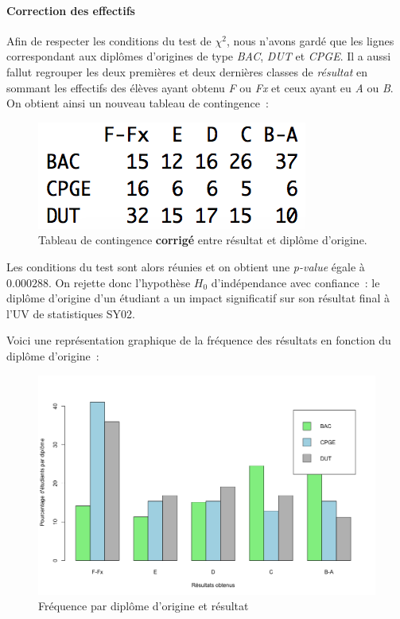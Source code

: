 \documentclass[a4paper,10pt]{report}
\begin{document}
\paragraph{Correction des effectifs}
Afin de respecter les conditions du test de $\chi^2$, nous n'avons gardé que les lignes correspondant aux diplômes d'origines de type \textit{BAC}, \textit{DUT} et \textit{CPGE}. Il a aussi fallut regrouper les deux premières et deux dernières classes de \textit{résultat} en sommant les effectifs des élèves ayant obtenu \textit{F} ou \textit{Fx} et ceux ayant eu \textit{A} ou \textit{B}.\\
On obtient ainsi un nouveau tableau de contingence~:


\begin{figure}[H]
	\centering
	\captionsetup{justification=centering, margin=4cm}
	\includegraphics[width=0.3\linewidth]{img/1-1-2-Contingence-Result-Diplome-Corrigee}
	\caption{\scriptsize Tableau de contingence \textbf{corrigé} entre résultat et diplôme d'origine.}
	\label{fig:tab_effectifs_et_contingence_resultats_diplome_origine_corrigee}
\end{figure}
Les conditions du test sont alors réunies et on obtient une \textit{p-value} égale à $0.000288$. On rejette donc l'hypothèse $H_{0}$ d'indépendance avec confiance~: le diplôme d'origine d'un étudiant a un impact significatif sur son résultat final à l'UV de statistiques SY02.

Voici une représentation graphique de la fréquence des résultats en fonction du diplôme d'origine~:

\begin{figure}[H]
	\centering
	\captionsetup{justification=centering, margin=2cm}
	\includegraphics[width=.4\linewidth]{img/1-1-2-Ratio-resultat-diplome}
	\caption{\scriptsize Fréquence par diplôme d'origine et résultat}
	\label{fig:ratio_resultats_diplome}
\end{figure}
\end{document}
